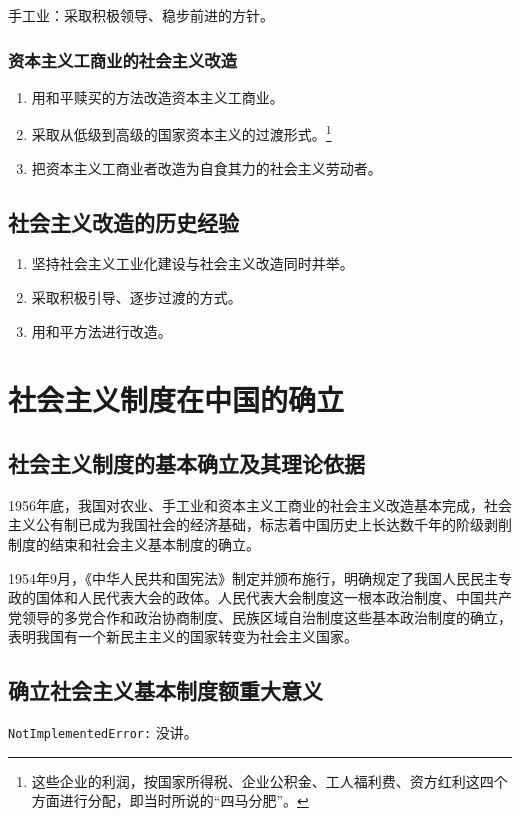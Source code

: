         手工业：采取积极领导、稳步前进的方针。

        \subsubsection{资本主义工商业的社会主义改造}
        \begin{enumerate}
            \item 用和平赎买的方法改造资本主义工商业。
            \item 采取从低级到高级的国家资本主义的过渡形式。\footnote{这些企业的利润，按国家所得税、企业公积金、工人福利费、资方红利这四个方面进行分配，即当时所说的“四马分肥”。}
            \item 把资本主义工商业者改造为自食其力的社会主义劳动者。
        \end{enumerate}

    \subsection{社会主义改造的历史经验}
    \begin{enumerate}
        \item 坚持社会主义工业化建设与社会主义改造同时并举。
        \item 采取积极引导、逐步过渡的方式。
        \item 用和平方法进行改造。
    \end{enumerate}


\section{社会主义制度在中国的确立}

    \subsection{社会主义制度的基本确立及其理论依据}
    1956年底，我国对农业、手工业和资本主义工商业的社会主义改造基本完成，社会主义公有制已成为我国社会的经济基础，标志着中国历史上长达数千年的阶级剥削制度的结束和社会主义基本制度的确立。

    1954年9月，《中华人民共和国宪法》制定并颁布施行，明确规定了我国人民民主专政的国体和人民代表大会的政体。人民代表大会制度这一根本政治制度、中国共产党领导的多党合作和政治协商制度、民族区域自治制度这些基本政治制度的确立，表明我国有一个新民主主义的国家转变为社会主义国家。

    \subsection{确立社会主义基本制度额重大意义}
    \verb|NotImplementedError:| 没讲。
